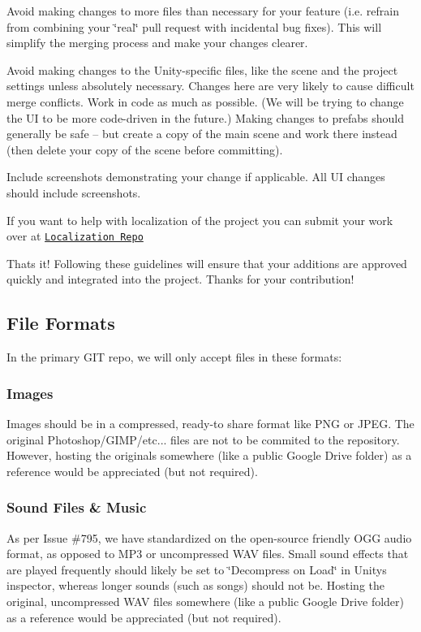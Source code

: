 \begin{DoxyItemize}
\item Avoid making changes to more files than necessary for your feature (i.\+e. refrain from combining your \char`\"{}real\char`\"{} pull request with incidental bug fixes). This will simplify the merging process and make your changes clearer.
\item Avoid making changes to the Unity-\/specific files, like the scene and the project settings unless absolutely necessary. Changes here are very likely to cause difficult merge conflicts. Work in code as much as possible. (We will be trying to change the UI to be more code-\/driven in the future.) Making changes to prefabs should generally be safe -- but create a copy of the main scene and work there instead (then delete your copy of the scene before committing).
\item Include screenshots demonstrating your change if applicable. All UI changes should include screenshots.
\item If you want to help with localization of the project you can submit your work over at \href{https://github.com/QuiZr/ProjectPorcupineLocalization/tree/Someone_will_come_up_with_a_proper_naming_scheme_later}{\tt Localization Repo}
\end{DoxyItemize}

That\textquotesingle{}s it! Following these guidelines will ensure that your additions are approved quickly and integrated into the project. Thanks for your contribution!

\subsection*{File Formats}

In the primary G\+IT repo, we will only accept files in these formats\+:

\subsubsection*{Images}

Images should be in a compressed, ready-\/to share format like P\+NG or J\+P\+EG. The original Photoshop/\+G\+I\+M\+P/etc... files are not to be commited to the repository. However, hosting the originals somewhere (like a public Google Drive folder) as a reference would be appreciated (but not required).

\subsubsection*{Sound Files \& Music}

As per Issue \#795, we have standardized on the open-\/source friendly O\+GG audio format, as opposed to M\+P3 or uncompressed W\+AV files. Small sound effects that are played frequently should likely be set to \char`\"{}\+Decompress on Load\char`\"{} in Unity\textquotesingle{}s inspector, whereas longer sounds (such as songs) should not be. Hosting the original, uncompressed W\+AV files somewhere (like a public Google Drive folder) as a reference would be appreciated (but not required). 